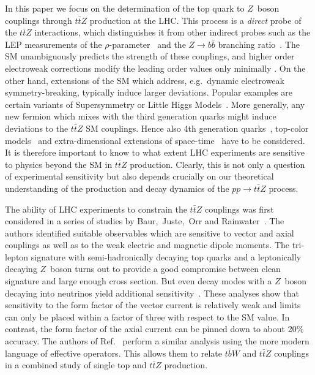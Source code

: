 \documentclass{JHEP3}
\def\ttbZ{t\bar{t}Z}
\begin{document}
In this paper we focus on the determination of the top quark to $Z$~boson couplings through $\ttbZ$ production at the LHC. 
This process is a {\it direct} probe of the $\ttbZ$ interactions, which distinguishes it from other indirect probes such as 
the LEP measurements of the $\rho$-parameter~\cite{ALEPH:2005ab} and the $Z \to b \bar{b}$ branching ratio~\cite{Abdallah:2008ab}. 
The SM unambiguously predicts the strength of these couplings, and higher order electroweak corrections modify the leading order values only minimally \cite{Hollik:1988ii}.
On the other hand, extensions of the SM which address, e.g.~dynamic electroweak symmetry-breaking, typically induce larger deviations. 
Popular examples are certain variants of Supersymmetry \cite{PhysRevD.82.055001,PhysRevD.84.015003} or Little Higgs Models~\cite{Schmaltz:2002wx,Cheng:2003ju}.
More generally, any new fermion which mixes with the third generation quarks might induce deviations to the $\ttbZ$ SM couplings. 
Hence also 4th generation quarks~\cite{Frampton:1999xi,Dobrescu:2009vz,Aguilar-Saavedra:2013qpa}, top-color models~\cite{PhysRevD.86.095017,Grojean:2013qca} and extra-dimensional extensions of space-time~\cite{Randall:1999ee,Richard:2013pwa} 
have to be considered.
It is therefore important to know to what extent LHC experiments are sensitive to physics beyond the SM in $\ttbZ$ production.
Clearly, this is not only a question of experimental sensitivity but also depends crucially on our theoretical understanding of the production and decay dynamics 
of the $pp\to\ttbZ$ process.

The ability of LHC experiments to constrain the $\ttbZ$ couplings was first considered in a series of studies by Baur,~Juste,~Orr and Rainwater~\cite{Baur:2004uw,Baur:2005wi}. 
The authors identified suitable observables which are sensitive to vector and axial couplings as well as to the weak electric and magnetic dipole moments.
The tri-lepton signature with semi-hadronically decaying top quarks and a leptonically decaying $Z$~boson turns out to provide a good compromise between
clean signature and large enough cross section. 
But even decay modes with a $Z$~boson decaying into neutrinos yield additional sensitivity~\cite{Baur:2005wi}.
These analyses show that sensitivity to the form factor of the vector current is relatively weak and limits can only be placed within a factor of three with respect to the SM value. 
In contrast, the form factor of the axial current can be pinned down to about 20\% accuracy. 
The authors of Ref.~\cite{Berger:2009hi} perform a similar analysis using the more modern language of effective operators.
This allows them to relate $t\bar{b}W$ and $\ttbZ$ couplings in a combined study of single top and $\ttbZ$ production.
\end{document}
